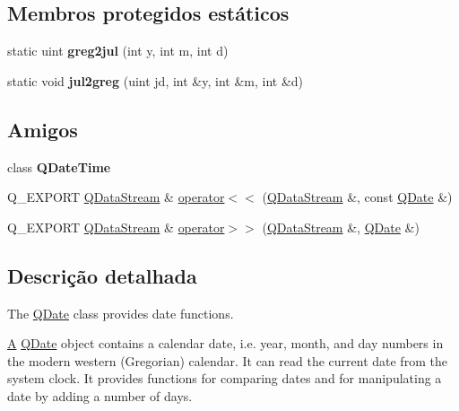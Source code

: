 \subsection*{Membros protegidos estáticos}
\begin{DoxyCompactItemize}
\item 
\hypertarget{class_q_date_a3bec6303ef8784b6c4a2f4d224ca0b45}{static uint {\bfseries greg2jul} (int y, int m, int d)}\label{class_q_date_a3bec6303ef8784b6c4a2f4d224ca0b45}

\item 
\hypertarget{class_q_date_ab211a96bb7d830953014d6bd2da9e4d2}{static void {\bfseries jul2greg} (uint jd, int \&y, int \&m, int \&d)}\label{class_q_date_ab211a96bb7d830953014d6bd2da9e4d2}

\end{DoxyCompactItemize}
\subsection*{Amigos}
\begin{DoxyCompactItemize}
\item 
\hypertarget{class_q_date_a9d2632bde958bcaf78a589a11578452e}{class {\bfseries Q\-Date\-Time}}\label{class_q_date_a9d2632bde958bcaf78a589a11578452e}

\item 
Q\-\_\-\-E\-X\-P\-O\-R\-T \hyperlink{class_q_data_stream}{Q\-Data\-Stream} \& \hyperlink{class_q_date_aebb24cfcc74a8440d7aff4d211276ab8}{operator$<$$<$} (\hyperlink{class_q_data_stream}{Q\-Data\-Stream} \&, const \hyperlink{class_q_date}{Q\-Date} \&)
\item 
Q\-\_\-\-E\-X\-P\-O\-R\-T \hyperlink{class_q_data_stream}{Q\-Data\-Stream} \& \hyperlink{class_q_date_ace58c33ac3870ee3b24fb6ce8db6f269}{operator$>$$>$} (\hyperlink{class_q_data_stream}{Q\-Data\-Stream} \&, \hyperlink{class_q_date}{Q\-Date} \&)
\end{DoxyCompactItemize}


\subsection{Descrição detalhada}
The \hyperlink{class_q_date}{Q\-Date} class provides date functions. 

\hyperlink{class_a}{A} \hyperlink{class_q_date}{Q\-Date} object contains a calendar date, i.\-e. year, month, and day numbers in the modern western (Gregorian) calendar. It can read the current date from the system clock. It provides functions for comparing dates and for manipulating a date by adding a number of days.

